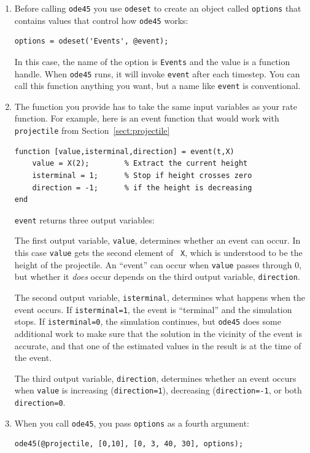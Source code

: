 \documentclass[
]{book}
\begin{document}
\begin{enumerate}

\item Before calling {\tt ode45} you use {\tt odeset} to create an
object called {\tt options} that contains values that control
how {\tt ode45} works:

\begin{verbatim}
options = odeset('Events', @event);
\end{verbatim}
%
In this case, the name of the option is {\tt Events} and the
value is a function handle.  When {\tt ode45} runs, it will invoke
{\tt event} after each timestep.
You can call this function anything you want, but a name
like {\tt event} is conventional.

\item The function you provide has to take
the same input variables as your rate function.  For example,
here is an event function that would work with {\tt projectile}
from Section~\ref{sect:projectile}

\begin{verbatim}
function [value,isterminal,direction] = event(t,X)
    value = X(2);        % Extract the current height
    isterminal = 1;      % Stop if height crosses zero
    direction = -1;      % if the height is decreasing
end
\end{verbatim}

{\tt event} returns three output variables:

The  first output variable, {\tt value}, determines whether an event can
        occur.  In this case {\tt value} gets the second element of {\tt
        X}, which is understood to be the height of the projectile.  An
        ``event'' can occur when {\tt value} passes through 0, but
        whether it \textit{does} occur depends on the third output
        variable, {\tt direction}.

The second output variable, {\tt isterminal}, determines what happens
        when the event occurs.  If {\tt isterminal=1}, the event is
        ``terminal'' and the simulation stops.  If {\tt isterminal=0},
        the simulation continues, but {\tt ode45} does some additional
        work to make sure that the solution in the vicinity of the event
        is accurate, and that one of the estimated values in the result
        is at the time of the event.

The third output variable, {\tt direction}, determines whether an event
        occurs when {\tt value} is increasing ({\tt direction=1}),
        decreasing ({\tt direction=-1}, or both {\tt direction=0}.



\item When you call {\tt ode45}, you pass {\tt options} as a fourth
argument:

\begin{verbatim}
ode45(@projectile, [0,10], [0, 3, 40, 30], options);
\end{verbatim}
%
\end{enumerate}
\end{document}
